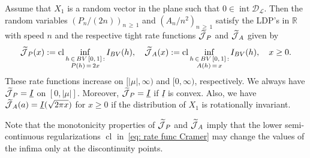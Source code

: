 \documentclass[10pt]{amsart}
\theoremstyle{definition}\newtheorem{defi}[theo]{Definition}\newtheorem{rema}[theo]{Remark}\newtheorem{exam}[theo]{Example}\newtheorem{exem}[theo]{Example}\newtheorem{nota}[theo]{Notation}
\DeclareMathOperator{\cl}{cl}
\DeclareMathOperator{\intr}{int}
\newcommand{\ubar}[1]{\underline{#1}}
\newcommand{\Rbb}{\mathbb{R}}
\newcommand{\Dcl}{\mathcal{D}}
\newcommand{\Lcl}{\mathcal{L}}
\newcommand{\Jcl}{\mathcal{J}}
\let\oldtilde\tilde
\renewcommand*{\tilde}[1]{\mathchoice{\widetilde{#1}}{\widetilde{#1}}{\oldtilde{#1}}{\oldtilde{#1}}}
\begin{document}
\begin{prop}\label{prop: Cramer}
Assume that $X_1$ is a random vector in the plane such that $0 \in \intr \Dcl_{\Lcl}$. Then the random variables $(P_n/(2n))_{n\,\ge\,1}$ and $(A_n/n^2)_{n\,\ge\,1}$ satisfy the LDP's in $\Rbb$ with speed $n$ and the respective tight rate functions $\tilde{\Jcl}_P $ and $\tilde{\Jcl}_A$ given by
\begin{equation}\label{eq: rate func Cramer}
\tilde{\Jcl}_P(x):=\cl \inf_{\substack{h\,\in\,BV\,[0,\,1]\,: \\ P(h)\,=\,2x}} I_{BV}(h), \quad \tilde{\Jcl}_A(x):=\cl \inf_{\substack{h\,\in\,BV\,[0,\,1]\,: \\ A(h)\,=\,x}} I_{BV}(h), \quad x \ge 0.
\end{equation}
These rate functions increase on $[|\mu|, \infty)$ and $[0, \infty)$, respectively. We always have $\tilde{\Jcl}_P = \ubar I$ on $[0, |\mu|]$. Moreover, $\tilde{\Jcl}_P = \ubar I$ if $\ubar I$ is convex. Also, we have $\tilde{\Jcl}_A(a) = \ubar I (\sqrt{2 \pi x})$ for $x \ge 0$ if the distribution of $X_1$ is rotationally invariant.
\end{prop}

Note that the monotonicity properties of $\tilde{\Jcl}_P$ and $\tilde{\Jcl}_A$ imply that the lower semi-continuous regularizations $\cl$ in~\eqref{eq: rate func Cramer} may change the values of the infima only at the discontinuity points.
\end{document}
